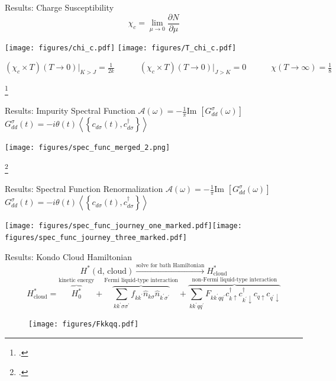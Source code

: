 \documentclass[aspectratio=169]{beamer}
\begin{document}
\begin{frame}[noframenumbering]{Results: Charge Susceptibility}
	\vspace*{-15pt}
	\[\chi_c = \lim_{\mu \to 0} \frac{\partial{N}}{\partial{\mu}}\]
\begin{center}
	\hspace*{-20pt}
	\texttt{[image: figures/chi\_c.pdf]}
	\hspace*{25pt}
	\texttt{[image: figures/T\_chi\_c.pdf]}
\end{center}
\large{\(
\left(\chi_c\times T\right)\left(T \to 0\right)\big\vert_{K>J} = \frac{1}{2k} \quad\quad\quad \left(\chi_c\times T\right)\left(T \to 0\right)\big\vert_{J>K} = 0 \quad\quad\quad \chi \left( T \to \infty \right) = \frac{1}{8}\)}

\footcite{taraphder,charge-kondo-Zitko}
\end{frame}

\begin{frame}[noframenumbering]{Results: Impurity Spectral Function}
	\(\mathcal{A(\omega)} = -\frac{1}{\pi}\text{Im }\left[G_{d d}^\sigma\left( \omega \right) \right]\) \hspace*{\fill} \(G_{d d}^\sigma\left(t\right) = -i\theta(t)\left<\left\{ c_{d\sigma}(t), c^\dagger_{d\sigma} \right\}\right>\)
\begin{center}
	\texttt{[image: figures/spec\_func\_merged\_2.png]}
\end{center}
\footcite{hewson,bulla_costi_nrg}
\end{frame}

\begin{frame}[noframenumbering]{Results: Spectral Function Renormalization}
	\(\mathcal{A(\omega)} = -\frac{1}{\pi}\text{Im }\left[G_{d d}^\sigma\left( \omega \right) \right]\) \hspace*{\fill} \(G_{d d}^\sigma\left(t\right) = -i\theta(t)\left<\left\{ c_{d\sigma}(t), c^\dagger_{d\sigma} \right\}\right>\)
\begin{center}
	\texttt{[image: figures/spec\_func\_journey\_one\_marked.pdf]}\hspace*{\fill}\texttt{[image: figures/spec\_func\_journey\_three\_marked.pdf]}
\end{center}
\end{frame}

\begin{frame}[noframenumbering]{Results: Kondo Cloud Hamiltonian}
	\vspace*{-10pt}
	\[H^*(\text{d, cloud}) \xrightarrow{\text{solve for bath Hamiltonian}} H^*_\text{cloud}\] 
	\[H^*_\text{cloud} = \overbrace{H^*_0}^\text{kinetic energy} + \overbrace{\sum_{kk^\prime\sigma\sigma^\prime}f_{kk^\prime}\hat n_{k\sigma}\hat n_{k^\prime\sigma^\prime}}^\text{Fermi liquid-type interaction} + \overbrace{\sum_{kk^\prime qq^\prime}F_{kk^\prime qq^\prime}c^\dagger_{k \uparrow}c^\dagger_{k^\prime \downarrow} c_{q \uparrow}c_{q^\prime \downarrow}}^\text{non-Fermi liquid-type interaction}\]
\begin{figure}[htpb]
	\centering
	\texttt{[image: figures/Fkkqq.pdf]}
\end{figure}
\end{frame}
\end{document}
